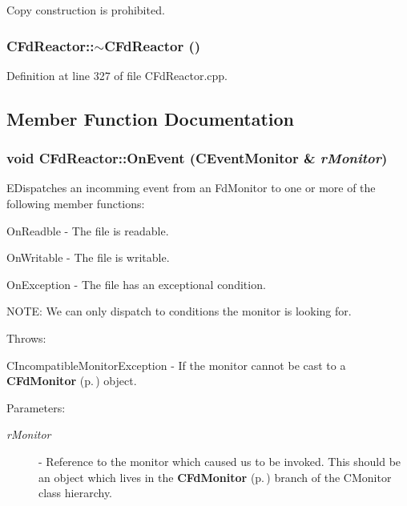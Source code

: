 Copy construction is prohibited.

\subsubsection{\setlength{\rightskip}{0pt plus 5cm}CFd\-Reactor::$\sim$CFd\-Reactor ()\hspace{0.3cm}{\tt  [virtual]}}\label{classCFdReactor_a3}




Definition at line 327 of file CFd\-Reactor.cpp.

\subsection{Member Function Documentation}
\subsubsection{\setlength{\rightskip}{0pt plus 5cm}void CFd\-Reactor::On\-Event ({\bf CEvent\-Monitor} \& {\em r\-Monitor})\hspace{0.3cm}{\tt  [virtual]}}\label{classCFdReactor_a5}


EDispatches an incomming event from an Fd\-Monitor to one or more of the following member functions:\begin{CompactItemize}
\item 
On\-Readble - The file is readable.\item 
On\-Writable - The file is writable.\item 
On\-Exception - The file has an exceptional condition.\end{CompactItemize}
NOTE: We can only dispatch to conditions the monitor is looking for.

Throws:\begin{CompactItemize}
\item 
CIncompatible\-Monitor\-Exception - If the monitor cannot be cast to a {\bf CFd\-Monitor} {\rm (p.\,\pageref{classCFdMonitor})} object.\end{CompactItemize}
\begin{Desc}
\item[Parameters: ]\par
\begin{description}
\item[{\em 
r\-Monitor}]- Reference to the monitor which caused us to be invoked. This should be an object which lives in the {\bf CFd\-Monitor} {\rm (p.\,\pageref{classCFdMonitor})} branch of the CMonitor class hierarchy. \end{description}
\end{Desc}


